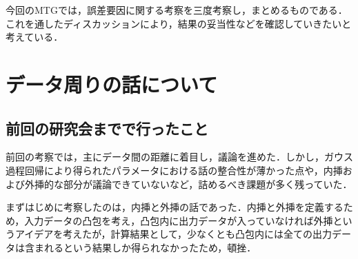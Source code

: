 \documentclass[16.7pt]{jsarticle}
\begin{document}
		
	\articleSPRobj
		今回のMTGでは，誤差要因に関する考察を三度考察し，まとめるものである．これを通したディスカッションにより，結果の妥当性などを確認していきたいと考えている．
		

	\articleSPRitemsone
		
		\tableofcontents
		
		
	\articleSPRitemstwo
	\renewcommand{\labelitemi}{$\blacktriangledown$}
	\newcommand{\argmax}{\mathop{\rm arg~max}\limits}
	\newcommand{\argmin}{\mathop{\rm arg~min}\limits}
	\newcommand{\Ker}{{\rm Ker}}
	\newcommand{\rank}{{\rm rank}}
\section{データ周りの話について}
		\subsection{前回の研究会までで行ったこと}
		前回の考察では，主にデータ間の距離に着目し，議論を進めた．しかし，ガウス過程回帰により得られたパラメータにおける話の整合性が薄かった点や，内挿および外挿的な部分が議論できていないなど，詰めるべき課題が多く残っていた．
		
		まずはじめに考察したのは，内挿と外挿の話であった．内挿と外挿を定義するため，入力データの凸包を考え，凸包内に出力データが入っていなければ外挿というアイデアを考えたが，計算結果として，少なくとも凸包内には全ての出力データは含まれるという結果しか得られなかったため，頓挫．
		
\end{document}
